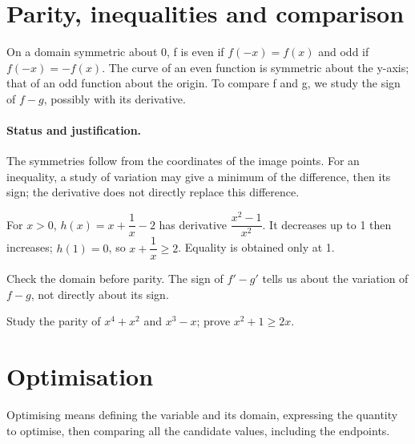 \section{Parity, inequalities and comparison}\label{C06-U4}
\begin{keypoint}
On a domain symmetric about 0, f is even if $f(-x)=f(x)$ and odd if $f(-x)=-f(x)$. The curve of an even function is symmetric about the y-axis; that of an odd function about the origin. To compare f and g, we study the sign of $f-g$, possibly with its derivative.
\end{keypoint}
\paragraph{Status and justification.} The symmetries follow from the coordinates of the image points. For an inequality, a study of variation may give a minimum of the difference, then its sign; the derivative does not directly replace this difference.
\begin{example}For $x>0$, $h(x)=x+\dfrac{1}{x}-2$ has derivative $\dfrac{x^2-1}{x^2}$. It decreases up to 1 then increases; $h(1)=0$, so $x+\dfrac{1}{x}\geq 2$. Equality is obtained only at 1.\end{example}\label{C06-EX4}
\begin{pitfall}Check the domain before parity. The sign of $f\prime-g\prime$ tells us about the variation of $f-g$, not directly about its sign.\end{pitfall}
\begin{application}Study the parity of $x^4+x^2$ and $x^3-x$; prove $x^2+1\geq2x$.\end{application}\label{C06-AP4}
\section{Optimisation}\label{C06-U5}
\begin{keypoint}
Optimising means defining the variable and its domain, expressing the quantity to optimise, then comparing all the candidate values, including the endpoints.
\end{keypoint}
